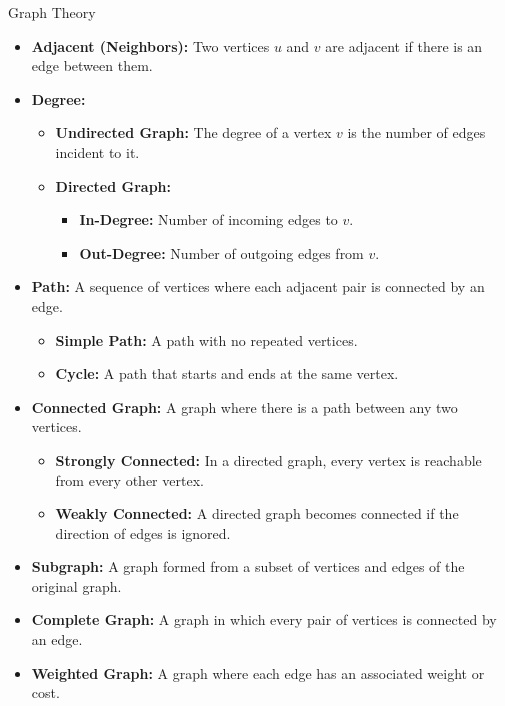 \begin{terms}[]{Graph Theory}
    \begin{itemize}
        \item \textbf{Adjacent (Neighbors):} Two vertices $u$ and $v$ are adjacent if there is an edge between them.
        \item \textbf{Degree:}
              \begin{itemize}
                  \item \textbf{Undirected Graph:} The degree of a vertex $v$ is the number of edges incident to it.
                  \item \textbf{Directed Graph:}
                        \begin{itemize}
                            \item \textbf{In-Degree:} Number of incoming edges to $v$.
                            \item \textbf{Out-Degree:} Number of outgoing edges from $v$.
                        \end{itemize}
              \end{itemize}
        \item \textbf{Path:} A sequence of vertices where each adjacent pair is connected by an edge.
              \begin{itemize}
                  \item \textbf{Simple Path:} A path with no repeated vertices.
                  \item \textbf{Cycle:} A path that starts and ends at the same vertex.
              \end{itemize}
        \item \textbf{Connected Graph:} A graph where there is a path between any two vertices.
              \begin{itemize}
                  \item \textbf{Strongly Connected:} In a directed graph, every vertex is reachable from every other vertex.
                  \item \textbf{Weakly Connected:} A directed graph becomes connected if the direction of edges is ignored.
              \end{itemize}
        \item \textbf{Subgraph:} A graph formed from a subset of vertices and edges of the original graph.
        \item \textbf{Complete Graph:} A graph in which every pair of vertices is connected by an edge.
        \item \textbf{Weighted Graph:} A graph where each edge has an associated weight or cost.

\end{itemize}
\end{terms}

